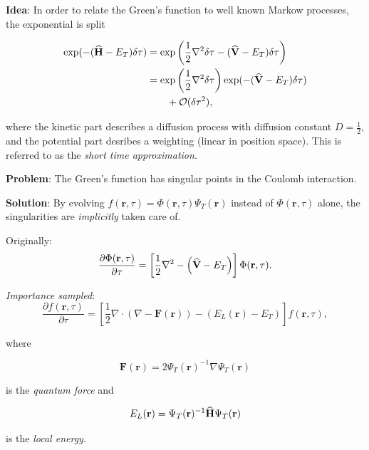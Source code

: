 \begin{frame}
 \textbf{Idea}: In order to relate the Green's function to well known Markow processes, the exponential is split
 
 \begin{align*}
  \exp(-({\bf\widehat{H}} - E_T)\delta\tau) &= \exp\left(\frac{1}{2}\nabla^2\delta\tau - ({\bf\widehat{V}} - E_T)\delta\tau\right)\\
     &= \exp\left(\frac{1}{2}\nabla^2\delta\tau\right)\exp( - ({\bf\widehat{V}} - E_T)\delta\tau) \\
     & \qquad  + \mathcal{O}(\delta\tau^2),
 \end{align*}
 
 where the kinetic part describes a diffusion process with diffusion constant $D=\frac{1}{2}$, and the potential part desribes a weighting (linear in position space). This is referred to as the \textit{short time approximation}.

 
\end{frame}

\begin{frame}
 \textbf{Problem}: The Green's function has singular points in the Coulomb interaction.
 \vspace{0.5cm}
 
 \pause
 
 \textbf{Solution}: By evolving $f(\mathbf{r}, \tau) = \Phi(\mathbf{r}, \tau)\Psi_T(\mathbf{r})$ instead of $\Phi(\mathbf{r}, \tau)$ alone, the singularities are \emph{implicitly} taken care of.
  
 \end{frame}

 \begin{frame}
   Originally:
 \begin{equation*}
  \frac{\partial \Phi(\mathbf{r}, \tau)}{\partial\tau} = \left[\frac{1}{2}\nabla^2 - \left({\bf\widehat{V}} - E_T\right)\right]\Phi(\mathbf{r}, \tau).
 \end{equation*}
 
 \pause
 
 \textit{Importance sampled}:
  \begin{equation}
  \frac{\partial f(\mathbf{r}, \tau)}{\partial\tau} = \left[\frac{1}{2}\nabla\cdot\left(\nabla - \mathbf{F}(\mathbf{r})\right) - (E_L(\mathbf{r}) - E_T)\right]f(\mathbf{r}, \tau),
 \end{equation}
 
 where
 
\begin{equation}
  \mathbf{F}(\mathbf{r}) =  2\Psi_T(\mathbf{r})^{-1}\nabla \Psi_T(\mathbf{r})
\end{equation}

is the \textit{quantum force} and 

\begin{equation} 
E_L(\mathbf{r}) = \Psi_T(\mathbf{r})^{-1}{\bf\widehat{H}}\Psi_T(\mathbf{r})
\end{equation}

is the \textit{local energy}. 

\end{frame}

